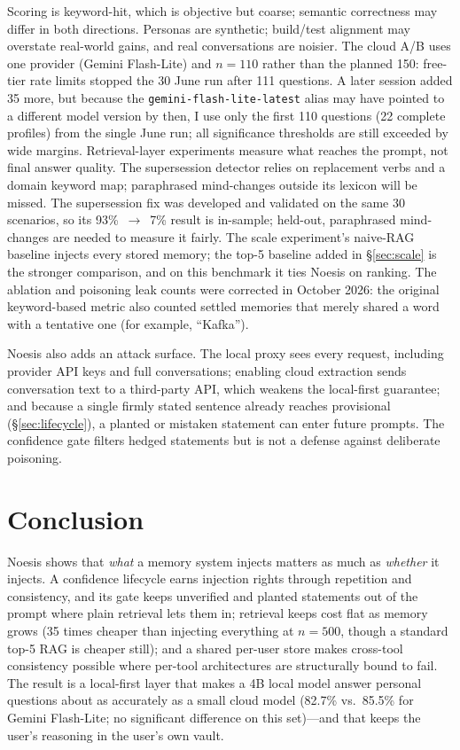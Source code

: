 \documentclass[11pt]{article}
\begin{document}
Scoring is keyword-hit, which is objective but coarse; semantic correctness
may differ in both directions. Personas are synthetic; build/test alignment
may overstate real-world gains, and real conversations are noisier. The
cloud A/B uses one provider (Gemini Flash-Lite) and $n{=}110$ rather than
the planned 150: free-tier rate limits stopped the 30 June run after 111
questions. A later session added 35 more, but because the
\texttt{gemini-flash-}\allowbreak\texttt{lite-latest} alias may have pointed to a different
model version by then, I use only the first 110 questions (22 complete
profiles) from the single June run; all significance thresholds are still
exceeded by wide margins. Retrieval-layer experiments measure what reaches
the prompt, not final answer quality. The supersession detector relies on
replacement verbs and a domain keyword map; paraphrased mind-changes outside
its lexicon will be missed. The supersession fix was developed and validated
on the same 30 scenarios, so its 93\%~$\to$~7\% result is in-sample;
held-out, paraphrased mind-changes are needed to measure it fairly. The
scale experiment's naive-RAG baseline injects every stored memory; the top-5
baseline added in \S\ref{sec:scale} is the stronger comparison, and on this
benchmark it ties Noesis on ranking. The ablation and poisoning leak counts
were corrected in October 2026: the original keyword-based metric also counted
settled memories that merely shared a word with a tentative one (for example,
``Kafka'').

Noesis also adds an attack surface. The local proxy sees every request,
including provider API keys and full conversations; enabling cloud
extraction sends conversation text to a third-party API, which weakens the
local-first guarantee; and because a single firmly stated sentence already
reaches provisional (\S\ref{sec:lifecycle}), a planted or mistaken statement
can enter future prompts. The confidence gate filters hedged statements but
is not a defense against deliberate poisoning.

\section{Conclusion}
\label{sec:conclusion}

Noesis shows that \emph{what} a memory system injects matters as much as
\emph{whether} it injects. A confidence lifecycle earns injection rights
through repetition and consistency, and its gate keeps unverified and planted
statements out of the prompt where plain retrieval lets them in; retrieval
keeps cost flat as memory grows (35 times cheaper than injecting everything at
$n{=}500$, though a standard top-5 RAG is cheaper still); and a shared per-user store makes cross-tool consistency
possible where per-tool architectures are structurally bound to fail. The
result is a local-first layer that makes a 4B local model answer personal
questions about as accurately as a small cloud model (82.7\% vs.\ 85.5\% for
Gemini Flash-Lite; no significant difference on this set)---and that keeps
the user's reasoning in the user's own vault.



\end{document}
